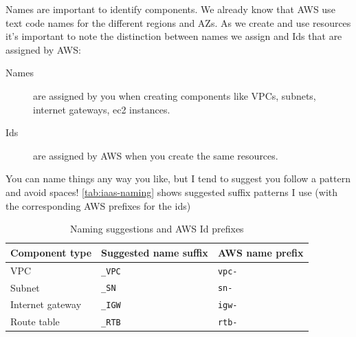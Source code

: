 Names are important to identify components.
We already know that AWS use text code names for the different regions and AZs.
As we create and use resources it's important to note the distinction between names we assign and Ids that are assigned by AWS:

\begin{description}
\item[Names]
  are assigned by you when creating components like VPCs, subnets, internet gateways, ec2 instances.
\item[Ids]
  are assigned by AWS when you create the same resources.
\end{description}

You can name things any way you like, but I tend to suggest you follow a pattern and avoid spaces!
\autoref{tab:iaas-naming} shows suggested suffix patterns I use (with the corresponding AWS prefixes for the ids)

\begin{table}[htbp]
  \centering
  \begin{tabular}{l l l}
    \toprule
    \textbf{Component type} & \textbf{Suggested name suffix} & \textbf{AWS name prefix}\\
    \midrule
    VPC & \texttt{\_VPC} & \texttt{vpc-}\\
    Subnet & \texttt{\_SN} & \texttt{sn-}\\
    Internet gateway & \texttt{\_IGW} & \texttt{igw-}\\
    Route table & \texttt{\_RTB} & \texttt{rtb-}\\
    \bottomrule
  \end{tabular}
  \caption{Naming suggestions and AWS Id prefixes}
  \label{tab:iaas-naming}
\end{table}

